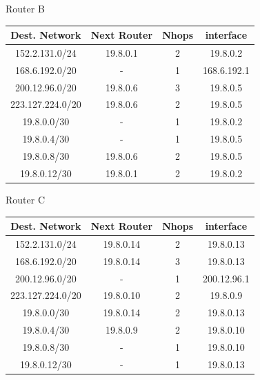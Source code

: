 \documentclass[a4paper, 11pt]{article}
\begin{document}
	\begin{center}
		Router B \\
		\vspace{2mm}
		
		\begin{tabular}{|c|c|c|c|}
			\hline
			Dest. Network  & Next Router & Nhops & interface\\ 
			\hline
				152.2.131.0/24 & 19.8.0.1 & 2 & 19.8.0.2\\ 
				168.6.192.0/20 & - & 1 & 168.6.192.1\\ 
				200.12.96.0/20 & 19.8.0.6 & 3 & 19.8.0.5\\ 
				223.127.224.0/20 & 19.8.0.6 & 2 & 19.8.0.5\\ 
				19.8.0.0/30 & - & 1 & 19.8.0.2\\ 
				19.8.0.4/30 & - & 1 & 19.8.0.5\\ 
				19.8.0.8/30 & 19.8.0.6 & 2 & 19.8.0.5\\ 
				19.8.0.12/30 & 19.8.0.1 & 2 & 19.8.0.2\\
			\hline
		\end{tabular}
	\end{center}

	\begin{center}
		Router C \\
		\vspace{2mm}
		
		\begin{tabular}{|c|c|c|c|}
			\hline
			Dest. Network  & Next Router & Nhops & interface\\ 
			\hline
				152.2.131.0/24 & 19.8.0.14 & 2 & 19.8.0.13\\ 
				168.6.192.0/20 & 19.8.0.14 & 3 & 19.8.0.13\\ 
				200.12.96.0/20 & - & 1 & 200.12.96.1\\ 
				223.127.224.0/20 & 19.8.0.10 & 2 & 19.8.0.9\\ 
				19.8.0.0/30 & 19.8.0.14 & 2 & 19.8.0.13\\ 
				19.8.0.4/30 & 19.8.0.9 & 2 & 19.8.0.10\\ 
				19.8.0.8/30 & - & 1 & 19.8.0.10\\ 
				19.8.0.12/30 & - & 1 & 19.8.0.13\\
			\hline
		\end{tabular}
	\end{center}
\end{document}
